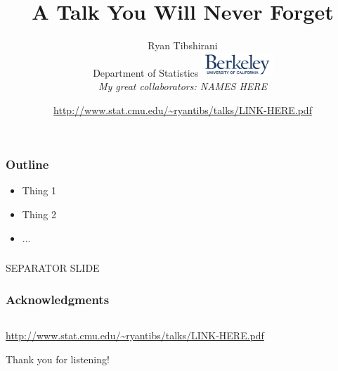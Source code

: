 \documentclass[mathserif]{beamer} %
\title{A Talk You Will Never Forget}
\author{\large Ryan Tibshirani \\
Department of Statistics 
\smallskip 
\includegraphics[height=0.35in]{ucb.png} \\
\bigskip
\normalsize
{\it My great collaborators: NAMES HERE}}
\date{\footnotesize
\url{http://www.stat.cmu.edu/~ryantibs/talks/LINK-HERE.pdf}}
\begin{document}
\begin{frame}
\bigskip
\maketitle
\thispagestyle{empty}
\end{frame} 
\addtocounter{framenumber}{-1}

\begin{frame}
\frametitle{}
\end{frame}

\begin{frame}
\frametitle{Outline}
\begin{itemize}
\item Thing 1
\item Thing 2
\item ...
\end{itemize}
\end{frame}

\begin{frame}
\frametitle{}
\centering\Large\blue 
\bigskip
SEPARATOR SLIDE
\end{frame}

\begin{frame}
\frametitle{Acknowledgments}
\begin{center}
\begin{tabular}{ccc}
\end{tabular}

\bigskip
{\small
\url{http://www.stat.cmu.edu/~ryantibs/talks/LINK-HERE.pdf}}

\bigskip
Thank you for listening!
\end{center}
\end{frame}
\end{document}
